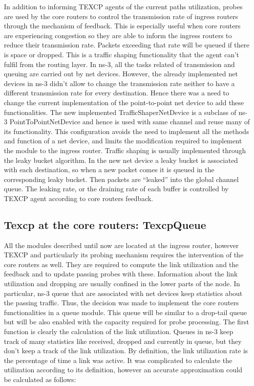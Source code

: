 In addition to informing TEXCP agents of the current paths utilization, probes are used by the core routers to control the transmission rate of ingress routers through the mechanism of feedback. This is especially useful when core routers are experiencing congestion so they are able to inform the ingress routers to reduce their transmission rate. Packets exceeding that rate will be queued if there is space or dropped. This is a traffic shaping functionality that the agent can't fulfil from the routing layer. In ns-3, all the tasks related of transmission and queuing are carried out by net devices. However, the already implemented net devices in ns-3 didn't allow to change the transmission rate neither to have a different transmission rate for every destination. Hence there was a need to change the current implementation of the point-to-point net device to add these functionalities. The new implemented TrafficShaperNetDevice is a subclass of ns-3 PointToPointNetDevice and hence is used with same channel and reuse many of its functionality. This configuration avoids the need to implement all the methods and function of a net device, and limits the modification required to implement the module to the ingress router. Traffic shaping is usually implemented through the leaky bucket algorithm. In the new net device a leaky bucket is associated with each destination, so when a new packet comes it is queued in the corresponding leaky bucket. Then packets are “leaked” into the global channel queue. The leaking rate, or the draining rate of each buffer is controlled  by TEXCP agent according to core routers feedback. 

\subsection{Texcp at the core routers: TexcpQueue}

All the modules described until now are located at the ingress router, however TEXCP and particularly its probing mechanism requires the intervention of the core routers as well. They are required to compute the link utilization and the feedback and to update passing probes with these. Information about the link utilization and dropping are usually confined in the lower parts of the node. In particular, ns-3 queue that are associated with net devices keep statistics about the passing traffic. Thus, the decision was made to implement the core routers functionalities in a queue module. This queue will be similar to a drop-tail queue but will be also enabled with the capacity required for probe processing. The first function is clearly the calculation of the link utilization. Queues in ns-3 keep track of many statistics like received, dropped and currently in queue, but they don't keep a track of the link utilization. By definition, the link utilization rate is the percentage of time a link was active. It was complicated to calculate the utilization according to its definition, however an accurate approximation could be calculated as follows:

